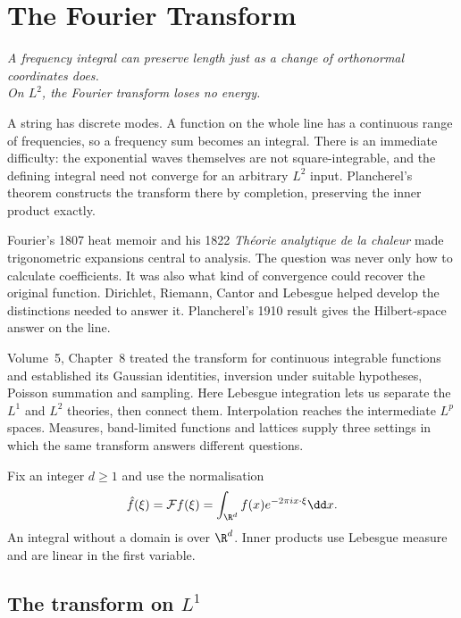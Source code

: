 \chapter{The Fourier Transform}\label{ch:fourier}

\begin{center}\itshape
A frequency integral can preserve length just as a change of orthonormal coordinates does.\\
On $L^2$, the Fourier transform loses no energy.
\end{center}

A string has discrete modes. A function on the whole line has a continuous range of frequencies, so a frequency sum becomes an integral. There is an immediate difficulty: the exponential waves themselves are not square-integrable, and the defining integral need not converge for an arbitrary $L^2$ input. Plancherel's theorem constructs the transform there by completion, preserving the inner product exactly.

Fourier's 1807 heat memoir and his 1822 \emph{Th\'eorie analytique de la chaleur} made trigonometric expansions central to analysis. The question was never only how to calculate coefficients. It was also what kind of convergence could recover the original function. Dirichlet, Riemann, Cantor and Lebesgue helped develop the distinctions needed to answer it. Plancherel's 1910 result gives the Hilbert-space answer on the line.

Volume~5, Chapter~8 treated the transform for continuous integrable functions and established its Gaussian identities, inversion under suitable hypotheses, Poisson summation and sampling. Here Lebesgue integration lets us separate the $L^1$ and $L^2$ theories, then connect them. Interpolation reaches the intermediate $L^p$ spaces. Measures, band-limited functions and lattices supply three settings in which the same transform answers different questions.

Fix an integer $d\ge1$ and use the normalisation
\[
\hat f(\xi)=\mathcal Ff(\xi)=\int_{\R^d}f(x)e^{-2\pi ix\cdot\xi}\dd x.
\]
An integral without a domain is over $\R^d$. Inner products use Lebesgue measure and are linear in the first variable.

\section{The transform on \texorpdfstring{$L^1$}{L1}}

